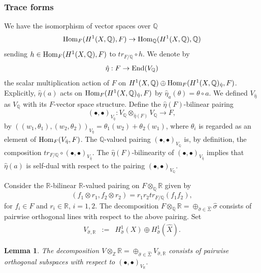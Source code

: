 \documentclass[12pt]{amsart}
\numberwithin{equation}{subsection}
\theoremstyle{plain}
\newtheorem{lem}[thm]{Lemma}
\theoremstyle{definition}
\newcommand{\QQ}{{\mathbb Q}}
\newcommand{\RR}{{\mathbb R}}
\newcommand{\ZZ}{{\mathbb Z}}
\newcommand{\Hom}{{\rm Hom}}
\newcommand{\End}{{\rm End}}
\begin{document}
{%
% 
\subsubsection{Trace forms}
We have the isomorphism of vector spaces over $\QQ$
\[
\Hom_F(H^1(X,\QQ),F) \rightarrow \Hom_\QQ(H^1(X,\QQ),\QQ)
\]
sending $h\in \Hom_F(H^1(X,\QQ),F)$ to $tr_{F/\QQ}\circ h$.
We denote by 
\[
\hat{\eta}:F\rightarrow \End(V_\QQ)
\]
the scalar multiplication action of $F$ on $H^1(X,\QQ)\oplus \Hom_F(H^1(X,\QQ)_{\hat{\eta}},F)$.
Explicitly, $\hat{\eta}(a)$ acts on $\Hom_F(H^1(X,\QQ)_{\hat{\eta}},F)$ by 
$\hat{\eta}_a(\theta)=\theta\circ a$.
We defined $V_{\hat{\eta}}$ as $V_\QQ$ with its $F$-vector space structure. 
Define the $\hat{\eta}(F)$-bilinear pairing 
\[
(\bullet,\bullet)_{V_{\hat{\eta}}} : V_\QQ\otimes_{\hat{\eta}(F)} V_\QQ\rightarrow F,
\]
by $((w_1,\theta_1),(w_2,\theta_2))_{V_{\hat{\eta}}}=\theta_1(w_2)+\theta_2(w_1)$, where $\theta_i$ is regarded as an element of $\Hom_F(V_{\hat{\eta}},F)$.
The $\QQ$-valued pairing 
$(\bullet,\bullet)_{V_\QQ}$ 
is, by definition, 
the composition $tr_{F/\QQ}\circ (\bullet,\bullet)_{V_{\hat{\eta}}}.$ The $\hat{\eta}(F)$-bilinearity of $(\bullet,\bullet)_{V_{\hat{\eta}}}$ implies that $\hat{\eta}(a)$ is 
self-dual with respect to the pairing
$(\bullet,\bullet)_{V_\QQ}$.

Consider the $\RR$-bilinear $\RR$-valued pairing on $F\otimes_\QQ\RR$ given by
\[
(f_1\otimes r_1,f_2\otimes r_2)=r_1r_2tr_{F/\QQ}(f_1f_2),
\]
for $f_i\in F$ and $r_i\in \RR$, $i=1,2$.
The decomposition $F\otimes_\QQ\RR=\oplus_{\hat{\sigma}\in\hat{\Sigma}}\hat{\sigma}$ consists of pairwise orthogonal lines with respect to the above pairing. Set 
\begin{eqnarray*}
V_{\hat{\sigma},\RR}&:=&H^1_{\hat{\sigma}}(X)\oplus H^1_{\hat{\sigma}}(\hat{X}).
\end{eqnarray*}

\begin{lem}
\label{lemma-orthogonal-direct-sum-decomposition-V-hat-sigma}
The decomposition $V\otimes_\ZZ\RR=\oplus_{\hat{\sigma}\in\hat{\Sigma}} V_{\hat{\sigma},\RR}$ consists of pairwise orthogonal subspaces with respect to $(\bullet,\bullet)_{V_\RR}.$
\end{lem}

}
\end{document}
